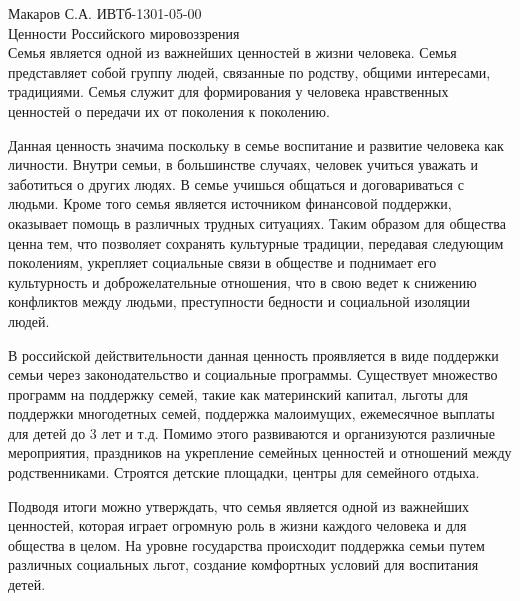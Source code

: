 \documentclass[a4paper,14pt]{extarticle}
\begin{document}
	\pagestyle{empty}
	\noindent Макаров С.А. ИВТб-1301-05-00 \\
	Ценности Российского мировоззрения \\
	
	Семья является одной из важнейших ценностей в жизни человека. Семья представляет собой группу людей, связанные по родству, общими интересами, традициями. Семья служит для формирования у человека нравственных ценностей о передачи их от поколения к поколению.
	
	Данная ценность значима поскольку в семье воспитание и развитие человека как личности. Внутри семьи, в большинстве случаях, человек учиться уважать и заботиться о других людях. В семье учишься общаться и договариваться с людьми. Кроме того семья является источником финансовой поддержки, оказывает помощь в различных трудных ситуациях. Таким образом для общества ценна тем, что позволяет сохранять культурные традиции, передавая следующим поколениям, укрепляет социальные связи в обществе и поднимает его культурность и доброжелательные отношения, что в свою ведет к снижению конфликтов между людьми, преступности бедности и социальной изоляции людей.
	
	В российской действительности данная ценность проявляется в виде поддержки семьи через законодательство и социальные программы. Существует множество программ на поддержку семей, такие как материнский капитал, льготы для поддержки многодетных семей, поддержка малоимущих, ежемесячное выплаты для детей до 3 лет и т.д. Помимо этого развиваются и организуются различные мероприятия, праздников на укрепление семейных ценностей и отношений между родственниками. Строятся детские площадки, центры для семейного отдыха.
	
	Подводя итоги можно утверждать, что семья является одной из важнейших ценностей, которая играет огромную роль в жизни каждого человека и для общества в целом. На уровне государства происходит поддержка семьи путем различных социальных льгот, создание комфортных условий для воспитания детей.
\end{document}
